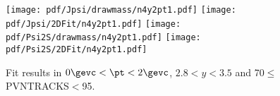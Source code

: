 \begin{figure}[H]
\begin{center}
\texttt{[image: pdf/Jpsi/drawmass/n4y2pt1.pdf]}
\texttt{[image: pdf/Jpsi/2DFit/n4y2pt1.pdf]}
\vspace*{-0.5cm}
\texttt{[image: pdf/Psi2S/drawmass/n4y2pt1.pdf]}
\texttt{[image: pdf/Psi2S/2DFit/n4y2pt1.pdf]}
\vspace*{-0.5cm}
\end{center}
\caption{Fit results in $0\gevc<\pt<2\gevc$, $2.8<y<3.5$ and 70$\leq$PVNTRACKS$<$95.}
\label{Fitn4y2pt1}
\end{figure}

